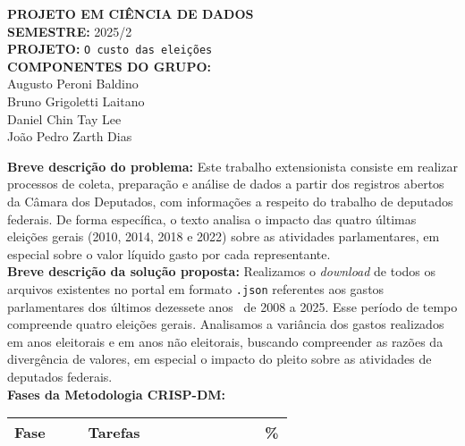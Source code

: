 \documentclass[12pt]{article}
\begin{document}
\begin{titlepage}
    \thispagestyle{fancy}

    \centering
    {\LARGE\textbf{PROJETO EM CIÊNCIA DE DADOS}}\\[1cm]
    
    \textbf{SEMESTRE:} 2025/2\\[0.5cm]
    \textbf{PROJETO:} \texttt{O custo das eleições}\\[0.5cm]
    \textbf{COMPONENTES DO GRUPO:}\\
    Augusto Peroni Baldino\\
    Bruno Grigoletti Laitano\\
    Daniel Chin Tay Lee\\
    João Pedro Zarth Dias\\[1cm]

    \begin{flushleft}
    \textbf{Breve descrição do problema:} Este trabalho extensionista consiste em realizar processos de coleta, preparação e análise de dados a partir dos registros abertos da Câmara dos Deputados, com informações a respeito do trabalho de deputados federais. De forma específica, o texto analisa o impacto das quatro últimas eleições gerais (2010, 2014, 2018 e 2022) sobre as atividades parlamentares, em especial sobre o valor líquido gasto por cada representante.\\[0.5cm]

    \textbf{Breve descrição da solução proposta:} Realizamos o \emph{download} de todos os arquivos existentes no portal em formato \texttt{.json} referentes aos gastos parlamentares dos últimos dezessete anos \textemdash \ de 2008 a 2025. Esse período de tempo compreende quatro eleições gerais. Analisamos a variância dos gastos realizados em anos eleitorais e em anos não eleitorais, buscando compreender as razões da divergência de valores, em especial o impacto do pleito sobre as atividades de deputados federais.\\[0.5cm]

    \textbf{Fases da Metodologia CRISP-DM:}
        \renewcommand{\arraystretch}{1.5}
        \begin{longtable}{>{\raggedright\arraybackslash}p{0.25\linewidth} >{\raggedright\arraybackslash}p{0.6\linewidth} >{\centering\arraybackslash}p{0.1\linewidth}}
            \toprule
            \textbf{Fase} & \textbf{Tarefas} & \textbf{\%} \\
            \midrule
            \endfirsthead
            

\end{longtable}
\end{flushleft}
\end{titlepage}
\end{document}
